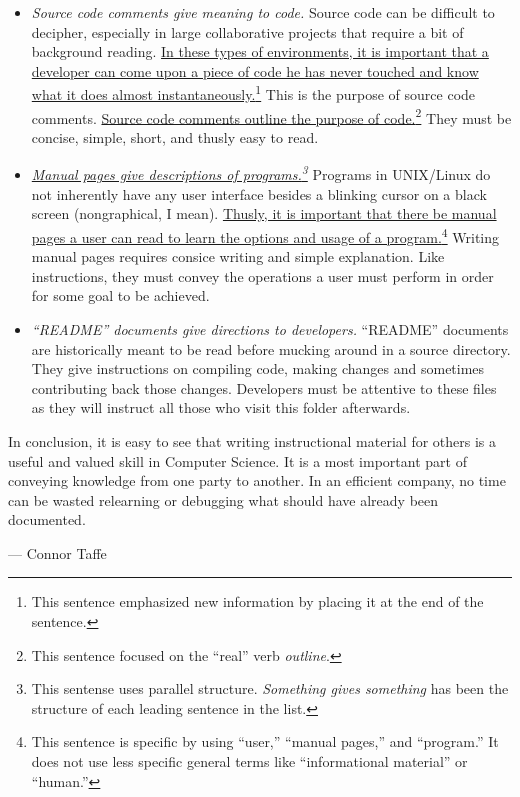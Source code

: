 \documentclass{memoir}
\begin{document}
\begin{itemize}
	\item{
		\emph{Source code comments give meaning to code.} Source code can be difficult to decipher, especially in large collaborative projects that require a bit of background reading. \ul{In these types of environments, it is important that a developer can come upon a piece of code he has never touched and know what it does almost instantaneously.}\footnote{
			This sentence emphasized new information by placing it at the end of the sentence.
		}
		This is the purpose of source code comments. \ul{Source code comments outline the purpose of code.}\footnote{
			This sentence focused on the ``real'' verb \emph{outline}.
		}
		They must be concise, simple, short, and thusly easy to read.
	}
	\item{
		\emph{\ul{Manual pages give descriptions of programs.}\footnote{
			This sentense uses parallel structure. \emph{Something gives something} has been the structure of each leading sentence in the list.
		}} Programs in UNIX/Linux do not inherently have any user interface besides a blinking cursor on a black screen (nongraphical, I mean). \ul{Thusly, it is important that there be manual pages a user can read to learn the options and usage of a program.}\footnote{
			This sentence is specific by using ``user,'' ``manual pages,'' and ``program.'' It does not use less specific general terms like ``informational material'' or ``human.''
		}
		Writing manual pages requires consice writing and simple explanation. Like instructions, they must convey the operations a user must perform in order for some goal to be achieved.
	}
	\item{
		\emph{``README'' documents give directions to developers.} ``README'' documents are historically meant to be read before mucking around in a source directory. They give instructions on compiling code, making changes and sometimes contributing back those changes. Developers must be attentive to these files as they will instruct all those who visit this folder afterwards.
	}
\end{itemize}

In conclusion, it is easy to see that writing instructional material for others is a useful and valued skill in Computer Science. It is a most important part of conveying knowledge from one party to another. In an efficient company, no time can be wasted relearning or debugging what should have already been documented.

\vspace{5mm}
--- Connor Taffe
\end{document}
